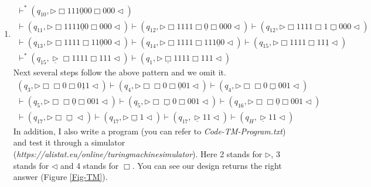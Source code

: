 \documentclass[12pt,a4paper]{article}
\makeatletter
\newtheorem*{solution}{Solution}
\theoremstyle{definition}
\renewenvironment{solution}[1][Solution] {\par\pushQED{\qed}\normalfont\topsep6\p@\@plus6\p@\relax\trivlist\item[\hskip\labelsep\bfseries#1\@addpunct{.}]\ignorespaces}{\popQED\endtrivlist\@endpefalse} \makeatother
\makeatother
\begin{document}
\begin{enumerate}
\begin{solution}
\begin{enumerate}
\begin{align*}
     \vdash^{*}(q_{10},\triangleright  \Box  1  1  1  \underline{0}  0  0  \Box 0  0  0   \triangleleft)\\
     \vdash(q_{11},\triangleright  \Box  1  1  1  1  \underline{0}  0  \Box 0  0  0   \triangleleft)
     \vdash(q_{12},\triangleright  \Box  1  1  1  1  \Box  \underline{0}  \Box 0  0  0   \triangleleft)
     \vdash(q_{12},\triangleright  \Box  1  1  1  1  \Box  1  \underline{\Box} 0  0  0   \triangleleft)\\
     \vdash(q_{13},\triangleright  \Box  1  1  1  1  \Box  1  1  \underline{0}  0  0   \triangleleft)
     \vdash(q_{14},\triangleright  \Box  1  1  1  1  \Box  1  1  1  \underline{0}  0   \triangleleft)
     \vdash(q_{15},\triangleright  \Box  1  1  1  1  \Box  1  1  \underline{1}  \triangleleft)\\
     \vdash^{*}(q_{15},\underline{\triangleright}  \Box  1  1  1  1  \Box  1  1  1  \triangleleft)
     \vdash(q_{1},\triangleright  \underline{\Box}  1  1  1  1  \Box  1  1  1  \triangleleft)
    \end{align*}
    Next several steps follow the above pattern and we omit it.
    \begin{align*}
        (q_{3},\triangleright  \Box  \Box  0 \Box  0 \underline{1}  1  \triangleleft)
        \vdash
        (q_{4},\triangleright  \Box  \Box  0 \Box  \underline{0} 0  1  \triangleleft)
        \vdash
        (q_{4},\triangleright  \Box  \Box  0 \underline{\Box}  0 0  1  \triangleleft)\\
        \vdash
        (q_{5},\triangleright  \Box  \Box  \underline{0} \Box  0 0  1  \triangleleft)
        \vdash
        (q_{5},\triangleright  \Box  \underline{\Box}  0 \Box  0 0  1  \triangleleft)
        \vdash
        (q_{16},\triangleright  \Box  \Box  \underline{0} \Box  0 0  1  \triangleleft)\\
        \vdash
        (q_{17},\triangleright  \Box  \underline{\Box}  \triangleleft )
        \vdash
        (q_{17},\triangleright  \underline{\Box}  1  \triangleleft )
        \vdash
        (q_{17},\underline{\triangleright}  1  1  \triangleleft )
        \vdash
        (q_{H},\underline{\triangleright}  1  1  \triangleleft )
    \end{align*}
    In addition, I also write a program (you can refer to \emph{Code-TM-Program.txt}) and test it through a simulator (\emph{https://alistat.eu/online/turingmachinesimulator}). Here 2 stands for $\triangleright$, 3 stands for $\triangleleft$ and 4 stands for $\Box$. You can see our design returns the right answer (Figure \ref{Fig-TM}).
    

\end{enumerate}
\end{solution}
\end{enumerate}
\end{document}
